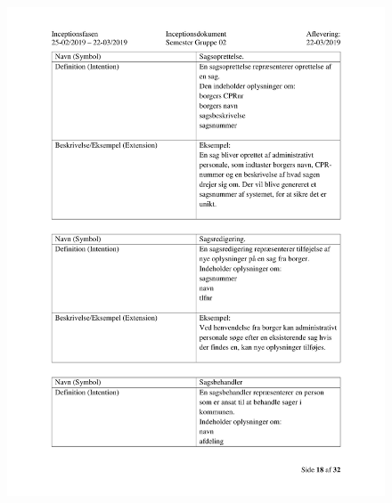 \begin{figure}[hb]
  \includegraphics[scale = 0.33]{./PNG/Inceptions/Gruppe02+InceptionsDokument-19.jpg} 
\end{figure}

